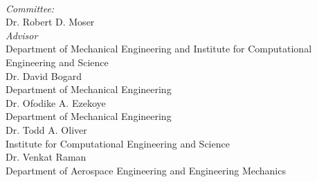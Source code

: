 \begin{titlepage}
\begin{minipage}{0.5\textwidth}
\begin{flushleft} \large
{}%
\end{flushleft}
\end{minipage}
~
\begin{minipage}{0.45\textwidth}
\begin{flushright} \large
\emph{Committee:} \\
 \vspace{5mm}
{\Large Dr. Robert D. Moser} \\
{\normalsize \textsl{Advisor}} \\
{\normalsize Department of Mechanical Engineering and Institute for Computational Engineering and Science} \\
 \vspace{5mm}
{\Large Dr. David Bogard} \\
{\normalsize Department of Mechanical Engineering} \\
 \vspace{5mm}
{\Large Dr. Ofodike A. Ezekoye} \\
{\normalsize Department of Mechanical Engineering} \\
 \vspace{5mm}
{\Large Dr. Todd A. Oliver} \\
{\normalsize Institute for Computational Engineering and Science} \\
 \vspace{5mm}
{\Large Dr. Venkat Raman} \\
{\normalsize Department of Aerospace Engineering and Engineering Mechanics} \\
\end{flushright}
\end{minipage}\\[4cm]




 

\vfill %

\end{titlepage}
%
